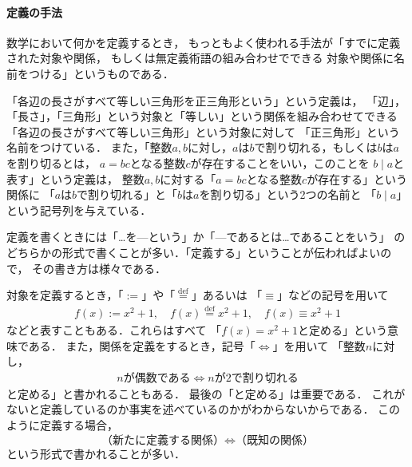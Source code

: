  \paragraph{定義の手法}
  数学において何かを定義するとき，
  もっともよく使われる手法が「すでに定義された対象や関係，
  もしくは無定義術語の組み合わせでできる
  対象や関係に名前をつける」というものである．
  \begin{ex} \label{ex:defhutuu}
    「各辺の長さがすべて等しい三角形を正三角形という」という定義は，
    「辺」，「長さ」，「三角形」という対象と「等しい」という関係を組み合わせてできる
    「各辺の長さがすべて等しい三角形」という対象に対して
    「正三角形」という名前をつけている．
    また，「整数$a,b$に対し，$a$は$b$で割り切れる，もしくは$b$は$a$を割り切るとは，
    $a=bc$となる整数$c$が存在することをいい，このことを
    $b \mid a$と表す」という定義は，
    整数$a,b$に対する「$a=bc$となる整数$c$が存在する」という関係に
    「$a$は$b$で割り切れる」と「$b$は$a$を割り切る」という2つの名前と
    「$b \mid a$」という記号列を与えている．
  \end{ex}

  定義を書くときには「…を---という」か「---であるとは…であることをいう」
  のどちらかの形式で書くことが多い．「定義する」ということが伝わればよいので，
  その書き方は様々である．

  対象を定義するとき，「${:=}$」や「$\overset{\mathrm{def}}{=}$」あるいは
  「$\equiv$」などの記号を用いて
  \begin{align*}
    f(x) := {x^2 + 1} , \quad 
    f(x) \overset{\mathrm{def}}{=} x^2 + 1 , \quad
    f(x) \equiv x^2+1
  \end{align*}
  などと表すこともある．これらはすべて
  「$f(x)=x^2+1$と定める」という意味である．
  また，関係を定義をするとき，記号「$\Longleftrightarrow$」を用いて
  「整数$n$に対し，
  \begin{align*}
    n \text{が偶数である} \Longleftrightarrow n \text{が2で割り切れる}
  \end{align*}
  と定める」と書かれることもある．
  最後の「と定める」は重要である．
  これがないと定義しているのか事実を述べているのかがわからないからである．
  このように定義する場合，
  \[
    \text{（新たに定義する関係）} \Longleftrightarrow \text{（既知の関係）}
  \]
  という形式で書かれることが多い．

